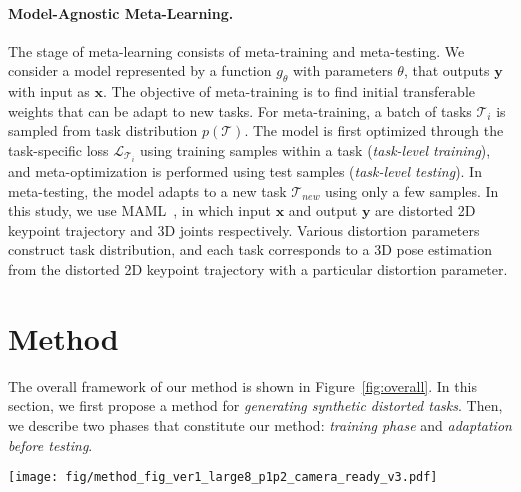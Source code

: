     \paragraph{Model-Agnostic Meta-Learning.}
        The stage of meta-learning consists of meta-training and meta-testing. We consider a model represented by a function $g_\theta$ with parameters $\theta$, that outputs $\mathbf{y}$ with input as $\mathbf{x}$. The objective of meta-training is to find initial transferable weights that can be adapt to new tasks. For meta-training, a batch of tasks $\mathcal{T}_i$ is sampled from task distribution $p(\mathcal{T})$. The model is first optimized through the task-specific loss $\mathcal{L}_{\mathcal{T}_{i}}$ using training samples within a task (\textit{task-level training}), and meta-optimization is performed using test samples (\textit{task-level testing}). In meta-testing, the model adapts to a new task $\mathcal{T}_{new}$ using only a few samples. In this study, we use MAML~\cite{ref20_pmlr-v70-finn17a}, in which input $\mathbf{x}$ and output $\mathbf{y}$ are distorted 2D keypoint trajectory and 3D joints respectively. Various distortion parameters construct task distribution, and each task corresponds to a 3D pose estimation from the distorted 2D keypoint trajectory with a particular distortion parameter.
\vspace{-1mm}


\section{Method}
    \vspace{-1mm}
    The overall framework of our method is shown in Figure~\ref{fig:overall}. In this section, we first propose a method for \textit{generating synthetic distorted tasks}. Then, we describe two phases that constitute our method: \textit{training phase} and \textit{adaptation before testing}.
    \vspace{-1mm}
    \begin{figure*}
        \begin{center}
            \texttt{[image: fig/method\_fig\_ver1\_large8\_p1p2\_camera\_ready\_v3.pdf]}
        \end{center}
        \vspace{-4.5mm}
        \caption{Overall framework of our methods. (a) We train a 2D-keypoint-conditioned 3D pose estimator that can quickly adapt to any distortions using only an undistorted large-scale dataset. Before the trained network can be used in practice, it must be adapted to a certain distortion. (b) and (c) represent adaptation method for \small$\textit{Scenario 1}$ \normalsize and \small$\textit{Scenario 2}$\normalsize, respectively.}
        \vspace{-1mm}
        \label{fig:overall}
        \vspace{-2.5mm}
    \end{figure*}
    
